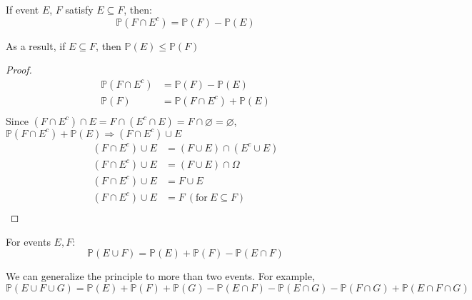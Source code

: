 \begin{proposition}
    If event \(E\), \(F\) satisfy \(E \subseteq F\), then: 
    \[
        \mathbb{P}(F \cap E^c) = \mathbb{P}(F) - \mathbb{P}(E)
    \]

    \begin{remark}
        As a result, if \(E \subseteq F\), then \(\mathbb{P}(E) \leq \mathbb{P}(F)\) 
    \end{remark}
    \begin{proof}
        \[
            \begin{aligned}
                \mathbb{P}(F \cap E^c) &= \mathbb{P}(F) - \mathbb{P}(E) \\
                \mathbb{P}(F) &= \mathbb{P}(F \cap E^c) + \mathbb{P}(E) \\
            \end{aligned}
        \]
        Since \((F \cap E^c) \cap E = F \cap (E^c \cap E) = F \cap \varnothing = \varnothing\), \(\mathbb{P}(F \cap E^c) + \mathbb{P}(E) \Rightarrow (F \cap E^c) \cup E\)
        \[
            \begin{aligned}
                (F \cap E^c) \cup E &= (F \cup E) \cap (E^c \cup E) \\
                (F \cap E^c) \cup E &= (F \cup E) \cap \Omega \\
                (F \cap E^c) \cup E &= F \cup E \\
                (F \cap E^c) \cup E &= F\ (\text{for}\ E \subseteq F)\\
            \end{aligned}
        \]
    \end{proof}
\end{proposition}

\begin{proposition}
    For events \(E, F\):
    \[
        \mathbb{P}(E \cup F) = \mathbb{P}(E) + \mathbb{P}(F) - \mathbb{P}(E \cap F)
    \]

    \begin{remark}
        We can generalize the principle to more than two events. For example, 
        \[
            \mathbb{P}(E \cup F \cup G) = \mathbb{P}(E) + \mathbb{P}(F) + \mathbb{P}(G) - \mathbb{P}(E \cap F) - \mathbb{P}(E \cap G) - \mathbb{P}(F \cap G) + \mathbb{P}(E \cap F \cap G)
        \]
    \end{remark}
\end{proposition}

